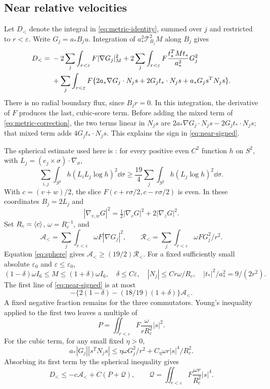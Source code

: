 \subsection{Near relative velocities}

Let $D_<$ denote the integral in \eqref{eq:metric-identity}, summed over $j$ and restricted to $r<\varepsilon$. Write $G_j=a_*B_ju$. Integration of $a_*^2\mathcal T_{B_j}^2M$ along $B_j$ gives
\begin{align}\label{eq:near-signed}
 D_<={}&-2\sum_j\int_{r<\varepsilon}F|\nabla G_j|_M^2
 +2\sum_j\int_{r<\varepsilon}F\frac{t_*^TMt_*}{a_*^2}G_j^2\notag\\
 &+\sum_j\int_{r<\varepsilon}F
 \{2a_*\nabla G_j\cdot N_js+2G_jt_*\cdot N_js+a_*G_js^TN_js\}.
\end{align}
There is no radial boundary flux, since $B_jr=0$. In this integration, the derivative of $F$ produces the last, cubic-score term. Before adding the mixed term of \eqref{eq:metric-correction}, the two terms linear in $N_js$ are
$2a_*\nabla G_j\cdot N_js-2G_jt_*\cdot N_js$; that mixed term adds $4G_jt_*\cdot N_js$. This explains the sign in \eqref{eq:near-signed}.

The spherical estimate used here is \cite[Lemma~9.1]{GS}: for every positive even $C^2$ function $h$ on $S^2$, with $L_j=(e_j\times\sigma)\cdot\nabla_\sigma$,
\begin{equation}\label{eq:sphere}
 \sum_{i,j}\int_{S^2}h(L_iL_j\log h)^2\dd\sigma
 \ge\frac{19}{4}\sum_j\int_{S^2}h(L_j\log h)^2\dd\sigma.
\end{equation}
With $c=(v+w)/2$, the slice $F(c+r\sigma/2,c-r\sigma/2)$ is even. In these coordinates $B_j=2L_j$ and
\[
 |\nabla_{v,w}G|^2=\tfrac12|\nabla_cG|^2+2|\nabla_zG|^2.
\]
Set $R_c=\langle c\rangle$, $\omega=R_c^{-1}$, and
\[
 \mathcal A_< =\sum_j\int_{r<\varepsilon}\omega F|\nabla G_j|^2,
 \qquad \mathcal R_< =\sum_j\int_{r<\varepsilon}\omega FG_j^2/r^2.
\]
Equation \eqref{eq:sphere} gives $\mathcal A_<\ge(19/2)\mathcal R_<$.
For a fixed sufficiently small absolute $\varepsilon_0$ and $\varepsilon\le\varepsilon_0$,
\[
 (1-\delta)\omega I_6\le M\le(1+\delta)\omega I_6,\quad
 \delta\le C\varepsilon,\quad |N_j|\le Cr\omega/R_c,\quad
 |t_*|^2/a_*^2=9/(2r^2).
\]
The first line of \eqref{eq:near-signed} is at most
\[
 -\{2(1-\delta)-(18/19)(1+\delta)\}\mathcal A_<.
\]
A fixed negative fraction remains for the three commutators. Young's inequality applied to the first two leaves a multiple of
\[
 P=\iint_{r<\varepsilon}F\frac{\omega}{rR_c^2}|s|^2.
\]
For the cubic term, for any small fixed $\eta>0$,
\[
 a_*|G_j||s^TN_js|
 \le\eta\omega G_j^2/r^2+C_\eta\omega r|s|^4/R_c^2.
\]
Absorbing its first term by the spherical inequality gives
\begin{equation}\label{eq:near-PT}
 D_<\le-c\mathcal A_<+C(P+\mathcal Q),\qquad
 \mathcal Q=\iint_{r<\varepsilon}F\frac{\omega r}{R_c^2}|s|^4.
\end{equation}

